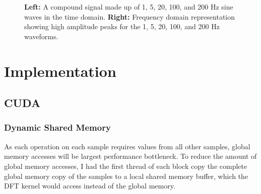 \documentclass[8pt,a4paper]{article}
\begin{document}
\begin{figure}[H]%
    \centering
    \qquad
    \vspace{5pt}
    \caption{\textbf{Left:} A compound signal made up of 1, 5, 20, 100, and 200 Hz sine waves in the time domain. \textbf{Right:} Frequency domain representation showing high amplitude peaks for the 1, 5, 20, 100, and 200 Hz waveforms.}%
    \label{fig:gridwatch}%
\end{figure}

\section{Implementation}
\subsection{CUDA}

\subsubsection{Dynamic Shared Memory}
As each operation on each sample requires values from all other samples, global memory accesses will be largest performance bottleneck. To reduce the amount of global memory accesses, I had the first thread of each block copy the complete global memory copy of the samples to a local shared memory buffer, which the DFT kernel would access instead of the global memory. 
\end{document}

